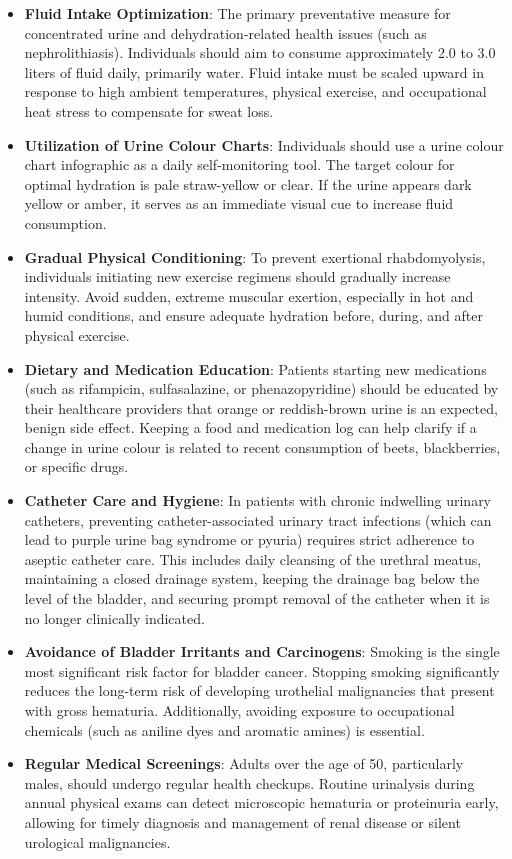 \begin{itemize}
  \item \textbf{Fluid Intake Optimization}: The primary preventative measure for concentrated urine and dehydration-related health issues (such as nephrolithiasis). Individuals should aim to consume approximately 2.0 to 3.0 liters of fluid daily, primarily water. Fluid intake must be scaled upward in response to high ambient temperatures, physical exercise, and occupational heat stress to compensate for sweat loss.

  \item \textbf{Utilization of Urine Colour Charts}: Individuals should use a urine colour chart infographic as a daily self-monitoring tool. The target colour for optimal hydration is pale straw-yellow or clear. If the urine appears dark yellow or amber, it serves as an immediate visual cue to increase fluid consumption.

  \item \textbf{Gradual Physical Conditioning}: To prevent exertional rhabdomyolysis, individuals initiating new exercise regimens should gradually increase intensity. Avoid sudden, extreme muscular exertion, especially in hot and humid conditions, and ensure adequate hydration before, during, and after physical exercise.

  \item \textbf{Dietary and Medication Education}: Patients starting new medications (such as rifampicin, sulfasalazine, or phenazopyridine) should be educated by their healthcare providers that orange or reddish-brown urine is an expected, benign side effect. Keeping a food and medication log can help clarify if a change in urine colour is related to recent consumption of beets, blackberries, or specific drugs.

  \item \textbf{Catheter Care and Hygiene}: In patients with chronic indwelling urinary catheters, preventing catheter-associated urinary tract infections (which can lead to purple urine bag syndrome or pyuria) requires strict adherence to aseptic catheter care. This includes daily cleansing of the urethral meatus, maintaining a closed drainage system, keeping the drainage bag below the level of the bladder, and securing prompt removal of the catheter when it is no longer clinically indicated.

  \item \textbf{Avoidance of Bladder Irritants and Carcinogens}: Smoking is the single most significant risk factor for bladder cancer. Stopping smoking significantly reduces the long-term risk of developing urothelial malignancies that present with gross hematuria. Additionally, avoiding exposure to occupational chemicals (such as aniline dyes and aromatic amines) is essential.

  \item \textbf{Regular Medical Screenings}: Adults over the age of 50, particularly males, should undergo regular health checkups. Routine urinalysis during annual physical exams can detect microscopic hematuria or proteinuria early, allowing for timely diagnosis and management of renal disease or silent urological malignancies.
\end{itemize}


